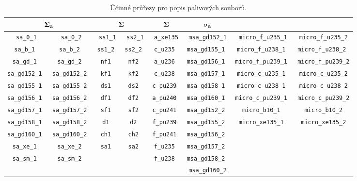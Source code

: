 \begin{table}[h]
\scriptsize
\centering
\caption{Účinné průřezy pro popis palivových souborů.}
\label{tab:fap_sigma}
\begin{tabular}{|c|c|c|c|c|c|c|c|}
\hline
{} &  &  $\mathbf{\Sigma}$ &  $\mathbf{\sigma_a}$ &  \\ \hline
\texttt{sa\_0\_1} & \texttt{sa\_0\_2} & \texttt{ss1\_1} & \texttt{ss2\_1} & \texttt{a\_xe135} & \texttt{msa\_gd152\_1} & \texttt{micro\_f\_u235\_1} & \texttt{micro\_f\_u235\_2} \\ \hline
\texttt{sa\_b\_1     }& \texttt{sa\_b\_2     }& \texttt{ss1\_2 }& \texttt{ss2\_2 }& \texttt{c\_u235  }& \texttt{msa\_gd155\_1 }& \texttt{micro\_f\_u238\_1  }& \texttt{micro\_f\_u238\_2 }\\ \hline
\texttt{sa\_gd\_1    }& \texttt{sa\_gd\_2    }& \texttt{nf1   }& \texttt{nf2    }& \texttt{a\_u236  }&  \texttt{msa\_gd156\_1 }& \texttt{micro\_f\_pu239\_1 }& \texttt{micro\_f\_pu239\_2} \\ \hline
\texttt{sa\_gd152\_1 }& \texttt{sa\_gd152\_2 }& \texttt{kf1   }& \texttt{kf2    }& \texttt{c\_u238  }& \texttt{msa\_gd157\_1 }& \texttt{micro\_c\_u235\_1  }& \texttt{micro\_c\_u235\_2} \\ \hline
\texttt{sa\_gd155\_1 }& \texttt{sa\_gd155\_2 }& \texttt{ds1   }& \texttt{ds2    }& \texttt{c\_pu239 }& \texttt{msa\_gd158\_1 }& \texttt{micro\_c\_u238\_1  }& \texttt{micro\_c\_u238\_2} \\ \hline
\texttt{sa\_gd156\_1 }& \texttt{sa\_gd156\_2 }& \texttt{df1   }& \texttt{df2    }& \texttt{a\_pu240 }& \texttt{msa\_gd160\_1 }& \texttt{micro\_c\_pu239\_1 }& \texttt{micro\_c\_pu239\_2} \\ \hline
\texttt{sa\_gd157\_1 }& \texttt{sa\_gd157\_2 }& \texttt{sf1   }& \texttt{sf2    }& \texttt{c\_pu241 }& \texttt{msa\_gd152\_2 }& \texttt{micro\_b10\_1     }& \texttt{micro\_b10\_2} \\ \hline
\texttt{sa\_gd158\_1 }& \texttt{sa\_gd158\_2 }& \texttt{d1    }& \texttt{d2     }& \texttt{f\_pu239 }& \texttt{msa\_gd155\_2 }& \texttt{micro\_xe135\_1   }& \texttt{micro\_xe135\_2} \\ \hline
\texttt{sa\_gd160\_1 }& \texttt{sa\_gd160\_2 }& \texttt{ch1   }& \texttt{ch2    }& \texttt{f\_pu241 }& \texttt{msa\_gd156\_2 }&  &  \\ \hline
\texttt{sa\_xe\_1    }& \texttt{sa\_xe\_2    }& \texttt{sa1   }& \texttt{sa2    }& \texttt{f\_u235  }& \texttt{msa\_gd157\_2 }&  &  \\ \hline
\texttt{sa\_sm\_1    }& \texttt{sa\_sm\_2    }&  &  & \texttt{f\_u238 }& \texttt{msa\_gd158\_2 }&  &  \\ \hline
		      &  &  &  &  & \texttt{msa\_gd160\_2} &  &  \\ \hline
\end{tabular}
\end{table}
\newpage
